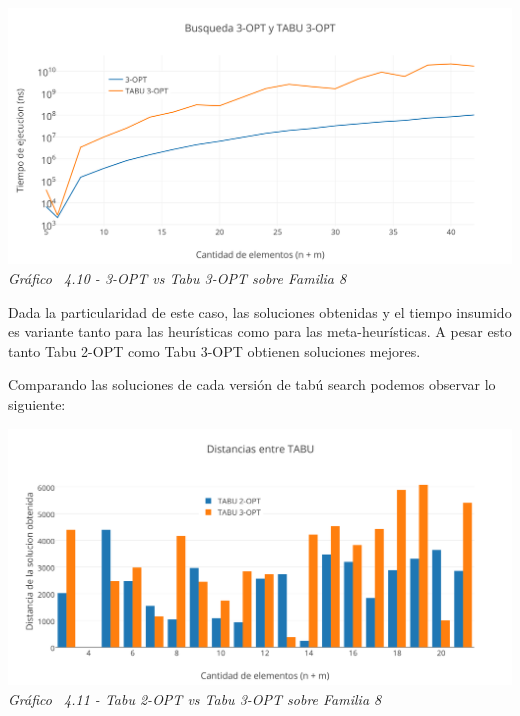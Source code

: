 \vspace*{0.3cm} \vspace*{0.3cm}
  \begin{center}
 \includegraphics[scale=0.5]{./EJ4/medicionrandom3opt.png}\\
 {            \textit{Gráfico \ 4.10 - 3-OPT vs Tabu 3-OPT sobre Familia 8}}
  \end{center}
  \vspace*{0.3cm}
  
Dada la particularidad de este caso, las soluciones obtenidas y el tiempo insumido es variante tanto para las heur\'isticas como para las meta-heur\'isticas. A pesar esto tanto Tabu 2-OPT como Tabu 3-OPT obtienen soluciones mejores.
  
Comparando las soluciones de cada versi\'on de tabú search podemos observar lo siguiente: 

\vspace*{0.3cm} \vspace*{0.3cm}
  \begin{center}
 \includegraphics[scale=0.5]{./EJ4/comparativorandom.png}\\
 {            \textit{Gráfico \ 4.11 - Tabu 2-OPT vs Tabu 3-OPT sobre Familia 8}}
  \end{center}
  \vspace*{0.3cm}

